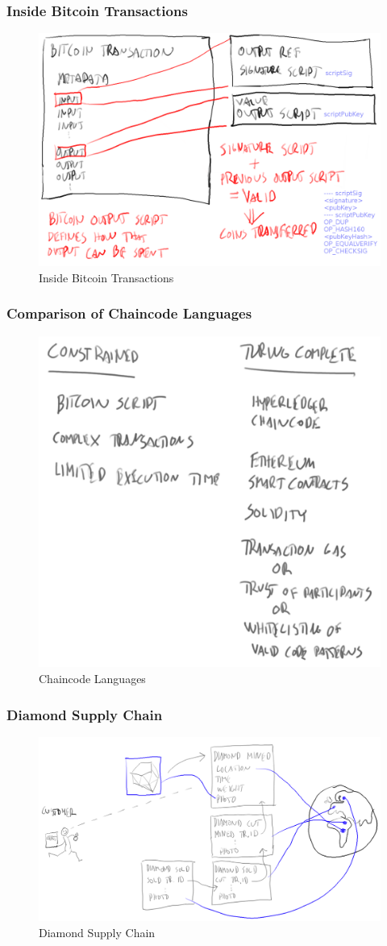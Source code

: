 \documentclass[8pt]{beamer}
\begin{document}
\begin{frame}
\frametitle{Inside Bitcoin Transactions}

\begin{figure}[tb]
 \centering
 \includegraphics[width=10 cm,keepaspectratio=true]{./blockchain_images/bitcoin_transactions.png}
 \caption{Inside Bitcoin Transactions}
\end{figure}

\end{frame}

\begin{frame}
\frametitle{Comparison of Chaincode Languages}

\begin{figure}[tb]
 \centering
 \includegraphics[width=6 cm,keepaspectratio=true]{./blockchain_images/chaincodes.png}
 \caption{Chaincode Languages}
\end{figure}

\end{frame}

\begin{frame}
\frametitle{Diamond Supply Chain}

\begin{figure}[tb]
 \centering
 \includegraphics[width=11 cm,keepaspectratio=true]{./blockchain_images/diamond.png}
 \caption{Diamond Supply Chain}
\end{figure}
\end{frame}
\end{document}
